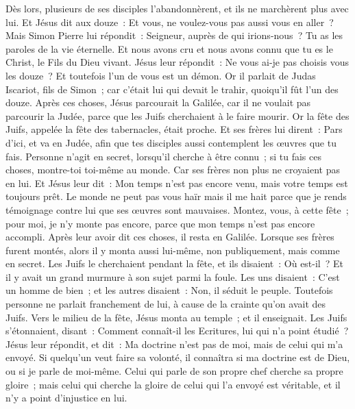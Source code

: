 \begin{multicols}{2}
Dès lors, plusieurs de ses disciples l'abandonnèrent, et ils ne marchèrent plus avec lui.
Et Jésus dit aux douze~: Et vous, ne voulez-vous pas aussi vous en aller~?
Mais Simon Pierre lui répondit~: Seigneur, auprès de qui irions-nous~? Tu as les paroles de la vie éternelle.
Et nous avons cru et nous avons connu que tu es le Christ, le Fils du Dieu vivant.
Jésus leur répondit~: Ne vous ai-je pas choisis vous les douze~? Et toutefois l'un de vous est un démon.
Or il parlait de Judas Iscariot, fils de Simon~; car c'était lui qui devait le trahir, quoiqu'il fût l'un des douze.
\VerseOne{}Après ces choses, Jésus parcourait la Galilée, car il ne voulait pas parcourir la Judée, parce que les Juifs cherchaient à le faire mourir.
Or la fête des Juifs, appelée la fête des tabernacles, était proche.
Et ses frères lui dirent~: Pars d'ici, et va en Judée, afin que tes disciples aussi contemplent les œuvres que tu fais.
Personne n'agit en secret, lorsqu'il cherche à être connu~; si tu fais ces choses, montre-toi toi-même au monde.
Car ses frères non plus ne croyaient pas en lui.
Et Jésus leur dit~: Mon temps n'est pas encore venu, mais votre temps est toujours prêt.
Le monde ne peut pas vous haïr mais il me hait parce que je rends témoignage contre lui que ses œuvres sont mauvaises.
Montez, vous, à cette fête~; pour moi, je n'y monte pas encore, parce que mon temps n'est pas encore accompli.
Après leur avoir dit ces choses, il resta en Galilée.
Lorsque ses frères furent montés, alors il y monta aussi lui-même, non publiquement, mais comme en secret.
Les Juifs le cherchaient pendant la fête, et ils disaient~: Où est-il~?
Et il y avait un grand murmure à son sujet parmi la foule. Les uns disaient~: C'est un homme de bien~; et les autres disaient~: Non, il séduit le peuple.
Toutefois personne ne parlait franchement de lui, à cause de la crainte qu'on avait des Juifs.
Vers le milieu de la fête, Jésus monta au temple~; et il enseignait.
Les Juifs s'étonnaient, disant~: Comment connaît-il les Ecritures, lui qui n'a point étudié~?
Jésus leur répondit, et dit~: Ma doctrine n'est pas de moi, mais de celui qui m'a envoyé.
Si quelqu'un veut faire sa volonté, il connaîtra si ma doctrine est de Dieu, ou si je parle de moi-même.
Celui qui parle de son propre chef cherche sa propre gloire~; mais celui qui cherche la gloire de celui qui l'a envoyé est véritable, et il n'y a point d'injustice en lui.

\end{multicols}
